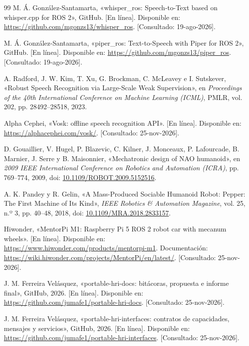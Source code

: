 \documentclass[11pt,letterpaper]{article}
\begin{document}
\begin{thebibliography}{99}
 M. Á. González-Santamarta, «whisper\_ros: Speech-to-Text based on whisper.cpp for ROS 2», GitHub. [En línea]. Disponible en: \url{https://github.com/mgonzs13/whisper_ros}. [Consultado: 19-ago-2026].

 M. Á. González-Santamarta, «piper\_ros: Text-to-Speech with Piper for ROS 2», GitHub. [En línea]. Disponible en: \url{https://github.com/mgonzs13/piper_ros}. [Consultado: 19-ago-2026].

 A. Radford, J. W. Kim, T. Xu, G. Brockman, C. McLeavey e I. Sutskever, «Robust Speech Recognition via Large-Scale Weak Supervision», en \emph{Proceedings of the 40th International Conference on Machine Learning (ICML)}, PMLR, vol. 202, pp. 28492--28518, 2023.

 Alpha Cephei, «Vosk: offline speech recognition API». [En línea]. Disponible en: \url{https://alphacephei.com/vosk/}. [Consultado: 25-nov-2026].

 D. Gouaillier, V. Hugel, P. Blazevic, C. Kilner, J. Monceaux, P. Lafourcade, B. Marnier, J. Serre y B. Maisonnier, «Mechatronic design of NAO humanoid», en \emph{2009 IEEE International Conference on Robotics and Automation (ICRA)}, pp. 769--774, 2009, doi: \href{https://doi.org/10.1109/ROBOT.2009.5152516}{10.1109/ROBOT.2009.5152516}.

 A. K. Pandey y R. Gelin, «A Mass-Produced Sociable Humanoid Robot: Pepper: The First Machine of Its Kind», \emph{IEEE Robotics \& Automation Magazine}, vol. 25, n.º 3, pp. 40--48, 2018, doi: \href{https://doi.org/10.1109/MRA.2018.2833157}{10.1109/MRA.2018.2833157}.

 Hiwonder, «MentorPi M1: Raspberry Pi 5 ROS 2 robot car with mecanum wheels». [En línea]. Disponible en: \url{https://www.hiwonder.com/products/mentorpi-m1}. Documentación: \url{https://wiki.hiwonder.com/projects/MentorPi/en/latest/}. [Consultado: 25-nov-2026].

 J. M. Ferreira Velásquez, «portable-hri-docs: bitácoras, propuesta e informe final», GitHub, 2026. [En línea]. Disponible en: \url{https://github.com/jumafe1/portable-hri-docs}. [Consultado: 25-nov-2026].

 J. M. Ferreira Velásquez, «portable-hri-interfaces: contratos de capacidades, mensajes y servicios», GitHub, 2026. [En línea]. Disponible en: \url{https://github.com/jumafe1/portable-hri-interfaces}. [Consultado: 25-nov-2026].


\end{thebibliography}
\end{document}
